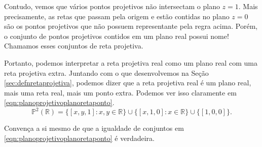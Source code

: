 Contudo, vemos que vários pontos projetivos não intersectam o plano \(z = 1\).
Mais precisamente, as retas que passam pela origem e estão contidas no plano \(z = 0\) são os pontos projetivos que não possuem representante pela regra acima.
Porém, o conjunto de pontos projetivos contidos em um plano real possui nome!
Chamamos esses conjuntos de reta projetiva.

Portanto, podemos interpretar a reta projetiva real como um plano real com uma reta projetiva extra.
Juntando com o que desenvolvemos na Seção \ref{sec:defnretaprojetiva}, podemos dizer que a reta projetiva real é um plano real, mais uma reta real, mais um ponto extra.
Podemos ver isso claramente em \ref{eqn:planoprojetivoplanoretaponto}.
\begin{equation} \label{eqn:planoprojetivoplanoretaponto}
  \mathbb{P}^2(\mathbb{R}) = \{ [x, y, 1] : x, y \in \mathbb{R} \} \cup \{[x, 1, 0] : x \in \mathbb{R}\} \cup \{[1, 0, 0]\}.
\end{equation}

\begin{exer}
  Convença a si mesmo de que a igualdade de conjuntos em \ref{eqn:planoprojetivoplanoretaponto} é verdadeira.
\end{exer}
